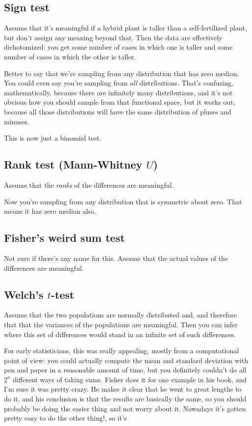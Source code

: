 \subsection{Sign test}\label{sign-test}

Assume that it's meaningful if a hybrid plant is taller than a
self-fertilized plant, but don't assign any meaning beyond that. Then
the data are effectively dichotomized: you get some number of cases in
which one is taller and some number of cases in which the other is
taller.

Better to say that we're sampling from any distribution that has zero
median. You could even say you're sampling from \emph{all}
distributions. That's confusing, mathematically, because there are
infinitely many distributions, and it's not obvious how you should
sample from that functional space, but it works out, because all those
distributions will have the same distribution of pluses and minuses.

This is now just a binomial test.

\subsection{Rank test (Mann-Whitney $U$)}

Assume that the \emph{ranks} of the differences are meaningful.

Now you're sampling from any distribution that is symmetric about zero.
That means it has zero median also.

\subsection{Fisher's weird sum test}\label{fishers-weird-sum-test}

Not sure if there's any name for this. Assume that the actual values of
the differences are meaningful.

\subsection{Welch's $t$-test}

Assume that the two populations are normally distributed and, and
therefore that that the variances of the populations are meaningful.
Then you can infer where this set of differences would stand in an
infinite set of such differences.

For early statisticians, this was really appealing, mostly from a
computational point of view: you could actually compute the mean and
standard deviation with pen and paper in a reasonable amount of time,
but you definitely couldn't do all \(2^n\) different ways of taking
sums. Fisher does it for one example in his book, and I'm sure it was
pretty crazy. He makes it clear that he went to great lengths to do it,
and his conclusion is that the results are basically the same, so you
should probably be doing the easier thing and not worry about it.
Nowadays it's gotten pretty easy to do the other thing!, so it's

